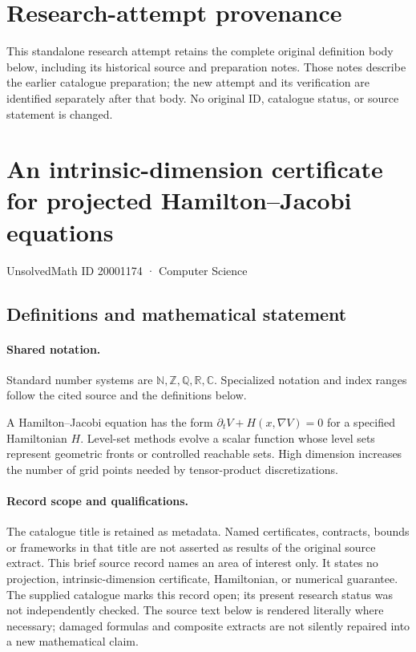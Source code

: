 \documentclass[11pt]{article}
\begin{document}
\section*{Research-attempt provenance}
This standalone research attempt retains the complete original definition body below,
including its historical source and preparation notes. Those notes describe the
earlier catalogue preparation; the new attempt and its verification are identified
separately after that body. No original ID, catalogue status, or source statement is changed.

\section{An intrinsic-dimension certificate for projected Hamilton--Jacobi equations}\label{20001174}
{\small UnsolvedMath ID 20001174 · Computer Science}
\subsection{Definitions and mathematical statement}

\paragraph{Shared notation.}Standard number systems are $\mathbb N,\mathbb Z,\mathbb Q,\mathbb R,\mathbb C$. Specialized notation and index ranges follow the cited source and the definitions below.


A Hamilton--Jacobi equation has the form $\partial_tV+H(x,\nabla V)=0$ for a specified Hamiltonian $H$. Level-set methods evolve a scalar function whose level sets represent geometric fronts or controlled reachable sets. High dimension increases the number of grid points needed by tensor-product discretizations.
\paragraph{Record scope and qualifications.}
The catalogue title is retained as metadata. Named certificates, contracts, bounds or frameworks in that title are not asserted as results of the original source extract.
This brief source record names an area of interest only. It states no projection, intrinsic-dimension certificate, Hamiltonian, or numerical guarantee. The supplied catalogue marks this record open; its present research status was not independently checked.
The source text below is rendered literally where necessary; damaged formulas and composite extracts are not silently repaired into a new mathematical claim.
\end{document}
